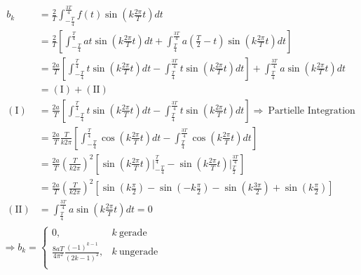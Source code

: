 \begin{gather}
    \begin{aligned}
        b_k &= \frac{2}{T} \int^{\frac{3T}{4}}_{-\frac{T}{4}} f(t)\sin(k \frac{2\pi}{T} t)dt\\
            &= \frac{2}{T} \left[\int^{\frac{T}{4}}_{-\frac{T}{4}} at\sin(k \frac{2\pi}{T} t)dt+ \int^{\frac{3T}{4}}_{\frac{T}{4}} a\left(\frac{T}{2}-t\right)\sin(k \frac{2\pi}{T} t)dt\right]\\
            &= \frac{2a}{T} \left[\int^{\frac{T}{4}}_{-\frac{T}{4}} t\sin(k \frac{2\pi}{T} t)dt - \int^{\frac{3T}{4}}_{\frac{T}{4}}t\sin(k \frac{2\pi}{T} t)dt\right] + \int^{\frac{3T}{4}}_{\frac{T}{4}}a\sin(k \frac{2\pi}{T} t)dt\\
            &= (\text{I}) + (\text{II})\\
        (\text{I}) &= \frac{2a}{T} \left[\int^{\frac{T}{4}}_{-\frac{T}{4}} t\sin(k \frac{2\pi}{T} t)
            dt - \int^{\frac{3T}{4}}_{\frac{T}{4}}t\sin(k \frac{2\pi}{T} t)dt\right] \Rightarrow~\text{Partielle Integration}\\
            &= \frac{2a}{T}\frac{T}{k2\pi}\left[\int^{\frac{T}{4}}_{-\frac{T}{4}} \cos(k \frac{2\pi}{T} t)dt - \int^{\frac{3T}{4}}_{\frac{T}{4}} \cos(k \frac{2\pi}{T} t)dt\right]\\
            &= \frac{2a}{T}\left(\frac{T}{k2\pi}\right)^2 \left[\sin(k \frac{2\pi}{T} t) \bigg \vert^{\frac{T}{4}}_{-\frac{T}{4}} - \sin(k \frac{2\pi}{T} t) \bigg \vert^{\frac{3T}{4}}_{\frac{T}{2}}\right]\\
            &= \frac{2a}{T}\left(\frac{T}{k2\pi}\right)^2 \left[\sin(k\frac{\pi}{2}) - \sin(-k\frac{\pi}{2}) - \sin(k\frac{3\pi}{2}) + \sin(k\frac{\pi}{2})\right]\\
        (\text{II}) &= \int^{\frac{3T}{4}}_{\frac{T}{4}}a\sin(k \frac{2\pi}{T} t)dt = 0
    \end{aligned}\\[0,5cm]
    \Rightarrow \boxed{b_k =
    \begin{cases}
        0, & k~\text{gerade}\\
        \frac{8aT}{4\pi^2}\frac{(-1)^{k-1}}{(2k-1)^2}, & k~\text{ungerade}\\
    \end{cases}}
\end{gather}
